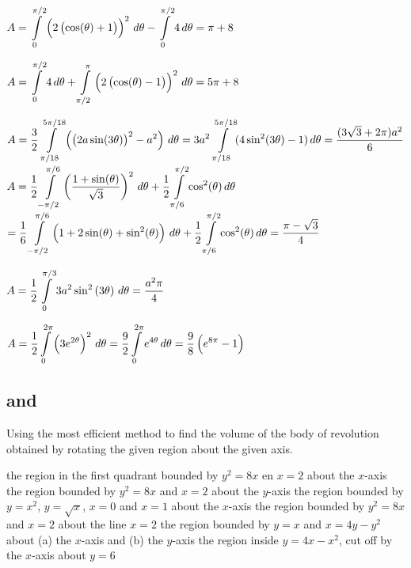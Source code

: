 \begin{Answer}
    \ifcalculus 
    \Question $A = \displaystyle \int\limits_{0}^{\pi/2} \left(2 \left(\cos (\theta)+1\right)\right)^2 \, d\theta - \displaystyle \int\limits_{0}^{\pi/2} 4  \, d\theta = \pi + 8$ 
    
    \Question $A = \displaystyle \int\limits_{0}^{\pi/2} 4 \, d\theta + \displaystyle \int\limits_{\pi/2}^{\pi} \left(2 \left(\cos (\theta)-1\right)\right)^2  \, d\theta   = 5\pi + 8$ %
    \fi
    
    \Question $A = \dfrac{3}{2} \displaystyle \int\limits_{\pi/18}^{5\pi/18} \left(\left(2a\sin (3\theta)\right)^2-a^2\right) \, d\theta  = 3a^2 \displaystyle \int\limits_{\pi/18}^{5\pi/18} (4\sin^2 (3\theta)-1) \, d\theta = \dfrac{(3\sqrt{3}+2\pi)a^2}{6}$ 
    \Question $A = \dfrac{1}{2} \displaystyle \int\limits_{-\pi/2}^{\pi/6} \left(\dfrac{1+\sin (\theta)}{\sqrt{3}}\right)^2 \, d\theta + \dfrac{1}{2} \displaystyle \int\limits_{\pi/6}^{\pi/2} \cos^2 (\theta) \, d\theta $ \\
    $= \dfrac{1}{6} \displaystyle \int\limits_{-\pi/2}^{\pi/6} \left(1+2 \sin (\theta) + \sin^2 (\theta)\right) \, d\theta + \dfrac{1}{2} \displaystyle \int\limits_{\pi/6}^{\pi/2} \cos^2 (\theta) \, d\theta= \dfrac{\pi - \sqrt{3}}{4}$ 
    
    \ifanalysis
    \Question $A = \dfrac{1}{2} \displaystyle \int\limits_{0}^{\pi/3} 3 a^2 \sin^2 \left(3 \theta \right)\, d \theta = \dfrac{a^2 \pi}{4}$
    \fi
    
    \Question $ A = \dfrac{1}{2} \displaystyle \int\limits_{0}^{2\pi} \left( 3 e^{2\theta} \right)^2 \, d\theta = \dfrac{9}{2} \displaystyle \int\limits_{0}^{2\pi}  e^{4\theta} \, d\theta = \dfrac{9}{8} \left( e^{8 \pi} - 1 \right)$
    

\end{Answer}

\subsection*{ and }
\begin{Exercise} Using the most efficient method to find the volume of the body of revolution obtained by rotating the given  region  about the given axis.

\Question[difficulty = 1] the region in the first quadrant bounded by $y^2=8x$ en $x=2$ about the $x$-axis
\Question[difficulty = 1] the region bounded by $y^2=8x$ and $x=2$ about the $y$-axis
\ifanalysis\Question[difficulty = 1]\fi\ifcalculus\Question[difficulty = 2]\fi the region bounded by $y=x^2$, $y=\sqrt{x}$, $x=0$ and $x=1$ about the $x$-axis
\Question[difficulty = 2] the region bounded by $y^2=8x$ and $x=2$ about the line $x=2$
\ifanalysis\Question[difficulty = 2]\fi\ifcalculus\Question[difficulty = 3]\fi the region bounded by $y=x$ and $x= 4y-y^2$ about (a) the $x$-axis and (b) the $y$-axis
\Question[difficulty = 3] the region inside $y=4x-x^2$, cut off by the $x$-axis about $y=6$

\end{Exercise}

